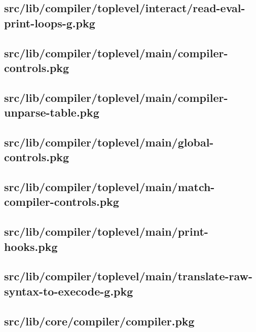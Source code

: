 \subsection{src/lib/compiler/toplevel/interact/read-eval-print-loops-g.pkg}


\subsection{src/lib/compiler/toplevel/main/compiler-controls.pkg}


\subsection{src/lib/compiler/toplevel/main/compiler-unparse-table.pkg}


\subsection{src/lib/compiler/toplevel/main/global-controls.pkg}


\subsection{src/lib/compiler/toplevel/main/match-compiler-controls.pkg}


\subsection{src/lib/compiler/toplevel/main/print-hooks.pkg}


\subsection{src/lib/compiler/toplevel/main/translate-raw-syntax-to-execode-g.pkg}


\subsection{src/lib/core/compiler/compiler.pkg}


